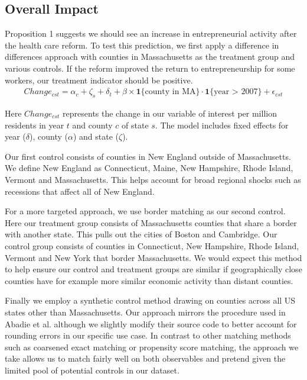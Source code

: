 \documentclass[12pt]{article}
\begin{document}
\subsection{Overall Impact}

Proposition 1 suggests we should see an increase in entrepreneurial activity after the health care reform. To test this prediction, we first apply a difference in differences approach with counties in Massachusetts as the treatment group and various controls. If the reform improved the return to entrepreneurship for some workers, our treatment indicator should be positive. 
\begin{align} \label{eq:overall}
Change_{cst} = \alpha_c + \zeta_s + \delta_t + \beta  \times \mathbf{1}\{\text{county in MA}\} \cdot \mathbf{1}\{\text{year > 2007}\} + \epsilon_{cst}
\end{align}

Here $Change_{cst}$ represents the change in our variable of interest per million residents in year $t$ and county $c$ of state $s$. The model includes fixed effects for year ($\delta$), county ($\alpha$) and state ($\zeta$).

Our first control consists of counties in New England outside of Massachusetts. We define New England as Connecticut, Maine, New Hampshire, Rhode Island, Vermont and Massachusetts. This helps account for broad regional shocks such as recessions that affect all of New England. 

For a more targeted approach, we use border matching as our second control. Here our treatment group consists of Massachusetts counties that share a border with another state. This pulls out the cities of Boston and Cambridge. Our control group consists of counties in Connecticut, New Hampshire, Rhode Island, Vermont and New York that border Massachusetts. We would expect this method to help ensure our control and treatment groups are similar if geographically close counties  have for example more similar economic activity than distant counties. 

Finally we employ a synthetic control method drawing on counties across all US states other than Massachusetts. Our approach mirrors the procedure used in Abadie et al. \citep{abadie2010synthetic} although we slightly modify their source code to better account for rounding errors in our specific use case. In contrast to other matching methods such as coarsened exact matching or propensity score matching, the approach we take allows us to match fairly well on both observables and pretend given the limited pool of potential controls in our dataset. 
\end{document}

